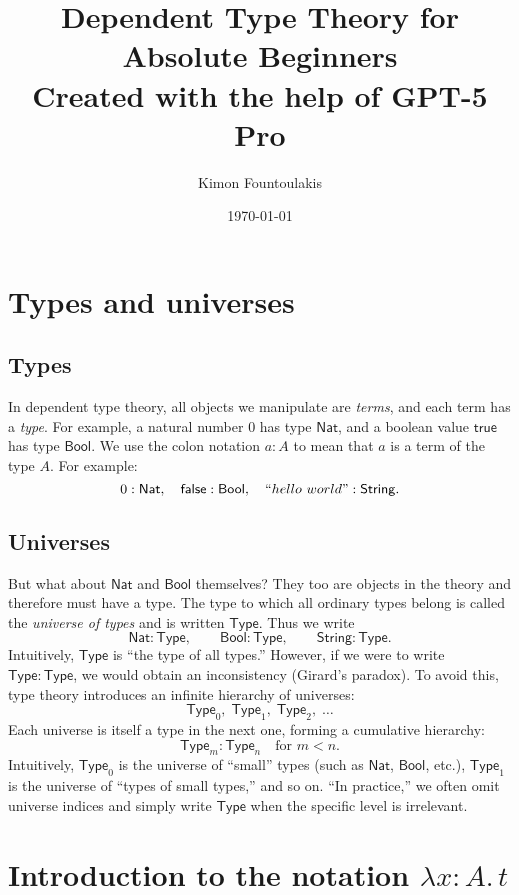 \documentclass{article}
\title{Dependent Type Theory for Absolute Beginners \\\vspace{0.2cm} 
\small Created with the help of GPT-5 Pro}
\author{Kimon Fountoulakis}
\date{\today}
\newcommand{\Type}{\ensuremath{\mathsf{Type}}}
\newcommand{\Nat}{\mathsf{Nat}}
\newcommand{\Bool}{\mathsf{Bool}}
\newcommand{\String}{\mathsf{String}}
\begin{document}
\maketitle
\tableofcontents
\newpage

\section{Types and universes}

\subsection*{Types}

In dependent type theory, all objects we manipulate are \emph{terms}, and each term has a \emph{type}.  
For example, a natural number \(0\) has type \(\Nat\), and a boolean value \(\mathsf{true}\) has type \(\Bool\). We use the colon notation \(a : A\) to mean that \(a\) is a term of the type \(A\).  
For example:
\[
0 : \Nat, \quad \mathsf{false} : \Bool, \quad ``hello \ world" : \String.
\]

\subsection*{Universes}

But what about \(\Nat\) and \(\Bool\) themselves?  
They too are objects in the theory and therefore must have a type.  
The type to which all ordinary types belong is called the \emph{universe of types} and is written \(\Type\).  
Thus we write
\[
\Nat : \Type, \qquad \Bool : \Type, \qquad \String : \Type.
\]
Intuitively, \(\Type\) is “the type of all types.”  
However, if we were to write \(\Type : \Type\), we would obtain an inconsistency (Girard’s paradox).  
To avoid this, type theory introduces an infinite hierarchy of universes:
\[
\Type_0,\;\Type_1,\;\Type_2,\;\dots
\]
Each universe is itself a type in the next one, forming a cumulative hierarchy:
\[
\Type_m : \Type_n \quad \text{for } m < n.
\]
Intuitively, $\Type_0$ is the universe of ``small'' types (such as $\Nat$, $\Bool$, etc.), $\Type_1$ is the universe of ``types of small types,'' and so on. ``In practice,'' we often omit universe indices and simply write $\Type$
when the specific level is irrelevant.


\section{Introduction to the notation \texorpdfstring{$\lambda x\!:\!A.\,t$}{λx:A.t}}
\end{document}
